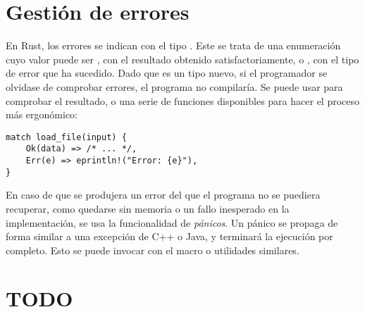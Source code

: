 \section{Gestión de errores}

En Rust, los errores se indican con el tipo . Este se trata
de una enumeración cuyo valor puede ser , con el resultado obtenido
satisfactoriamente, o , con el tipo de error que ha sucedido. Dado
que es un tipo nuevo, si el programador se olvidase de comprobar errores, el
programa no compilaría. Se puede usar  para comprobar el resultado,
o una serie de funciones disponibles para hacer el proceso más ergonómico:

\begin{verbatim}
match load_file(input) {
    Ok(data) => /* ... */,
    Err(e) => eprintln!("Error: {e}"),
}
\end{verbatim}

En caso de que se produjera un error del que el programa no se puediera
recuperar, como quedarse sin memoria o un fallo inesperado en la implementación,
se usa la funcionalidad de \emph{pánicos}. Un pánico se propaga de forma similar
a una excepción de C++ o Java, y terminará la ejecución por completo. Esto se
puede invocar con el macro  o utilidades similares.

\section{TODO}

